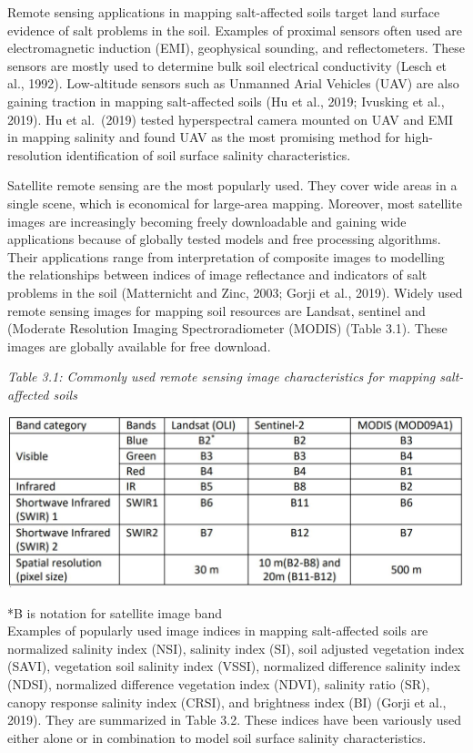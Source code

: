 \documentclass[
  10pt,
  b5paper,
]{book}
\begin{document}
Remote sensing applications in mapping salt-affected soils target land surface evidence of salt problems in the soil. Examples of proximal sensors often used are electromagnetic induction (EMI), geophysical sounding, and reflectometers. These sensors are mostly used to determine bulk soil electrical conductivity (Lesch et al., 1992). Low-altitude sensors such as Unmanned Arial Vehicles (UAV) are also gaining traction in mapping salt-affected soils (Hu et al., 2019; Ivusking et al., 2019). Hu et al.~(2019) tested hyperspectral camera mounted on UAV and EMI in mapping salinity and found UAV as the most promising method for high-resolution identification of soil surface salinity characteristics.

Satellite remote sensing are the most popularly used. They cover wide areas in a single scene, which is economical for large-area mapping. Moreover, most satellite images are increasingly becoming freely downloadable and gaining wide applications because of globally tested models and free processing algorithms. Their applications range from interpretation of composite images to modelling the relationships between indices of image reflectance and indicators of salt problems in the soil (Matternicht and Zinc, 2003; Gorji et al., 2019). Widely used remote sensing images for mapping soil resources are Landsat, sentinel and (Moderate Resolution Imaging Spectroradiometer (MODIS) (Table 3.1). These images are globally available for free download.

\emph{Table 3.1: Commonly used remote sensing image characteristics for mapping salt-affected soils}

\includegraphics{figures/tables/Table_3.1.jpg}

*B is notation for satellite image band\\
Examples of popularly used image indices in mapping salt-affected soils are normalized salinity index (NSI), salinity index (SI), soil adjusted vegetation index (SAVI), vegetation soil salinity index (VSSI), normalized difference salinity index (NDSI), normalized difference vegetation index (NDVI), salinity ratio (SR), canopy response salinity index (CRSI), and brightness index (BI) (Gorji et al., 2019). They are summarized in Table
3.2. These indices have been variously used either alone or in combination to model soil surface salinity characteristics.
\end{document}
